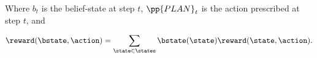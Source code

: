 \noindent Where $b_t$ is the belief-state at step $t$, $\pp{PLAN}_t$ is
the action prescribed at step $t$, and

\[\reward(\bstate, \action) = \sum_{\state \in \states}
\bstate(\state)\reward(\state, \action).\] 


